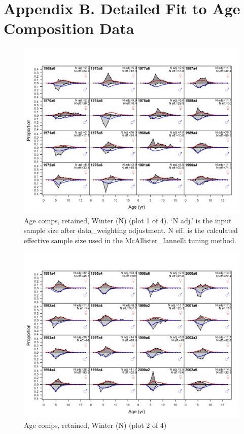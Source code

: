 \documentclass[12pt,]{article}
\begin{document}
\FloatBarrier

\section{Appendix B. Detailed Fit to Age Composition
Data}\label{appendix-b.-detailed-fit-to-age-composition-data}

\begin{figure}
\centering
\includegraphics{r4ss/plots_mod1/comp_agefit_flt1mkt2_page1.png}
\caption{Age comps, retained, Winter (N) (plot 1 of 4). `N adj.' is the
input sample size after data\_weighting adjustment. N eff. is the
calculated effective sample size used in the McAllister\_Iannelli tuning
method. \label{fig:age_fits}}
\end{figure}

\begin{figure}
\centering
\includegraphics{r4ss/plots_mod1/comp_agefit_flt1mkt2_page2.png}
\caption{Age comps, retained, Winter (N) (plot 2 of 4)
\label{fig:age_fits}}
\end{figure}
\end{document}
